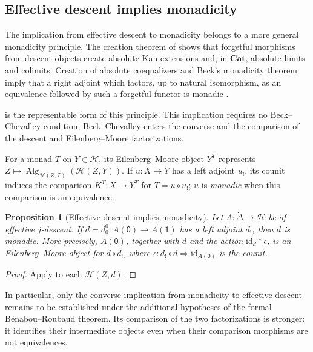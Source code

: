 \documentclass[11pt,a4paper]{article}
\numberwithin{equation}{section}
\newtheorem{proposition}[proposition]{Proposition}
\theoremstyle{definition}
\theoremstyle{remark}
\newcommand{\id}{\mathrm{id}}
\newcommand{\Hcat}{\mathcal H}
\newcommand{\Cat}{\mathbf{Cat}}
\begin{document}
\subsection{Effective descent implies monadicity}
\label{subsec:effective-monadic}

The implication from effective descent to monadicity belongs to
a more general monadicity principle. The creation theorem of
\cite[Corollaries~2.6--2.7]{Nunes2021} shows that forgetful morphisms
from descent objects create absolute Kan extensions and, in
$\Cat$, absolute limits and colimits. Creation of absolute
coequalizers and Beck's monadicity theorem imply that a right adjoint
which factors, up to natural isomorphism, as an equivalence followed
by such a forgetful functor is monadic
\cite[Theorem~2.8]{Nunes2021}.

 is the representable
form of this principle. This implication requires
no Beck--Chevalley condition; Beck--Chevalley enters the converse
and the comparison of the descent and Eilenberg--Moore
factorizations.

For a monad $T$ on $Y\in\Hcat$, its Eilenberg--Moore object $Y^T$
represents $Z\mapsto\operatorname{Alg}_{\Hcat(Z,T)}(\Hcat(Z,Y))$.
If $u\colon X\to Y$ has a left adjoint $u_!$, its counit induces
the comparison $K^T\colon X\to Y^T$ for $T=u\circ u_!$;
$u$ is \emph{monadic} when this comparison is an equivalence.

\begin{proposition}[Effective descent implies monadicity]
\label{prop:effective-implies-monadic}
Let $A\colon\dot\Delta\to\Hcat$ be of effective $j$-descent.
If $d=d_0^0\colon A(\mathsf 0)\to A(\mathsf 1)$ has a left adjoint $d_!$, then
$d$ is monadic. More precisely, $A(\mathsf 0)$, together with $d$ and the
action $\id_d\ast\epsilon$, is an Eilenberg--Moore object for $d\circ d_!$,
where $\epsilon\colon d_!\circ d\Rightarrow\id_{A(\mathsf 0)}$ is the counit.
\end{proposition}

\begin{proof}
Apply \cite[Theorem~2.8]{Nunes2021} to each $\Hcat(Z,d)$.
\end{proof}

In particular, only the converse implication from monadicity to
effective descent remains to be established under the additional
hypotheses of the formal B\'enabou--Roubaud theorem. Its comparison
of the two factorizations is stronger: it identifies their
intermediate objects even when their comparison morphisms are not
equivalences. 
\end{document}

